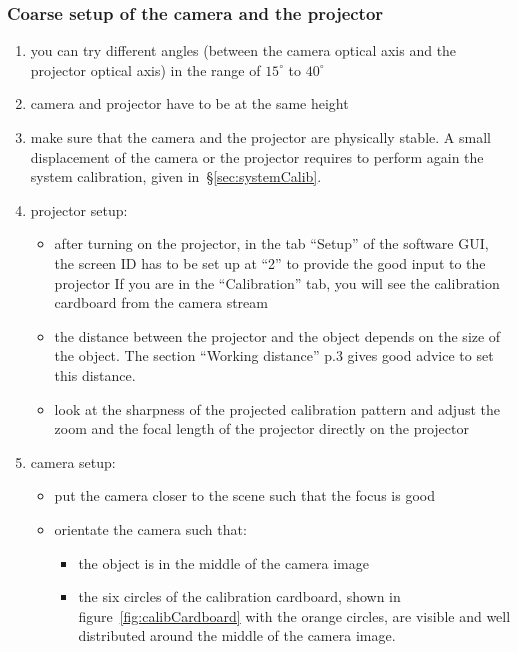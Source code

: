\documentclass[11pt]{article}
\begin{document}
\subsubsection{Coarse setup of the camera and the projector}
\begin{enumerate}
\item you can try different angles (between the camera optical axis and the projector optical axis) in the range of $15^{\circ}$ to $40^{\circ}$
\item camera and projector have to be at the same height
\item make sure that the camera and the projector are physically stable. 
A small displacement of the camera or the projector requires to perform again the system calibration, given in~\S\ref{sec:systemCalib}.
\item projector setup:
\begin{itemize}
\item after turning on the projector, in the tab ``Setup'' of the software GUI, the screen ID has to be set up at ``2'' to provide the good input to the projector
If you are in the ``Calibration'' tab, you will see the calibration cardboard from the camera stream
\item the distance between the projector and the object depends on the size of the object.
The section ``Working distance'' p.3 gives good advice to set this distance.
\item look at the sharpness of the projected calibration pattern and adjust the zoom and the focal length of the projector directly on the projector
\end{itemize}
\item camera setup:
\begin{itemize}
\item put the camera closer to the scene such that the focus is good
\item orientate the camera such that:
\begin{itemize}
\item the object is in the middle of the camera image
\item the six circles of the calibration cardboard, shown in figure~\ref{fig:calibCardboard} with the orange circles, are visible and well distributed around the middle of the camera image.
\end{itemize}
\end{itemize}


\end{enumerate}
\end{document}
